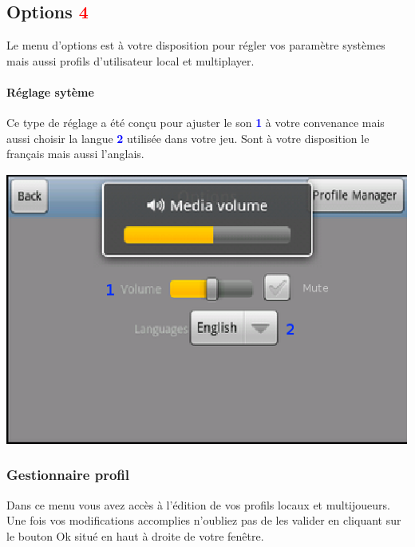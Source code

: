 \subsection{Options \textcolor{red}{4}}
	Le menu d'options est à votre disposition pour régler vos paramètre systèmes
	mais aussi profils d'utilisateur local et multiplayer.
	
	\paragraph{Réglage sytème\\}
	Ce type de réglage a été conçu pour ajuster le son
	\textcolor{blue}{\textbf{1}} à votre convenance mais aussi choisir la langue
	\textcolor{blue}{\textbf{2}} utilisée dans votre jeu. Sont à votre disposition
	le français mais aussi l'anglais.
	
	\begin{center}
		\includegraphics[scale=0.7]{Manuel/Img/4.eps}
	\end{center}
	
	\subsubsection{Gestionnaire profil}
		Dans ce menu vous avez accès à l'édition de vos profils locaux et
		multijoueurs. Une fois vos modifications accomplies n'oubliez pas de les
		valider en cliquant sur le bouton Ok situé en haut à droite de votre fenêtre.
